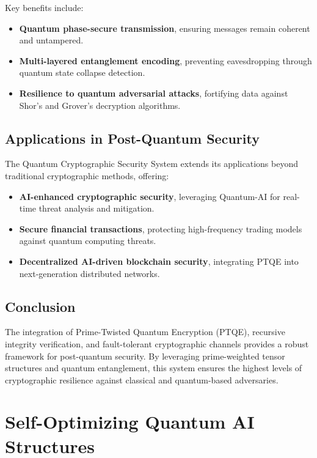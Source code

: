 \documentclass{article}
\theoremstyle{plain}
\begin{document}
Key benefits include:
\begin{itemize}
    \item \textbf{Quantum phase-secure transmission}, ensuring messages remain coherent and untampered.
    \item \textbf{Multi-layered entanglement encoding}, preventing eavesdropping through quantum state collapse detection.
    \item \textbf{Resilience to quantum adversarial attacks}, fortifying data against Shor’s and Grover’s decryption algorithms.
\end{itemize}

\subsection{Applications in Post-Quantum Security}

The Quantum Cryptographic Security System extends its applications beyond traditional cryptographic methods, offering:

\begin{itemize}
    \item \textbf{AI-enhanced cryptographic security}, leveraging Quantum-AI for real-time threat analysis and mitigation.
    \item \textbf{Secure financial transactions}, protecting high-frequency trading models against quantum computing threats.
    \item \textbf{Decentralized AI-driven blockchain security}, integrating PTQE into next-generation distributed networks.
\end{itemize}

\subsection{Conclusion}

The integration of Prime-Twisted Quantum Encryption (PTQE), recursive integrity verification, and fault-tolerant cryptographic channels provides a robust framework for post-quantum security. By leveraging prime-weighted tensor structures and quantum entanglement, this system ensures the highest levels of cryptographic resilience against classical and quantum-based adversaries.

\section{Self-Optimizing Quantum AI Structures}
\end{document}
